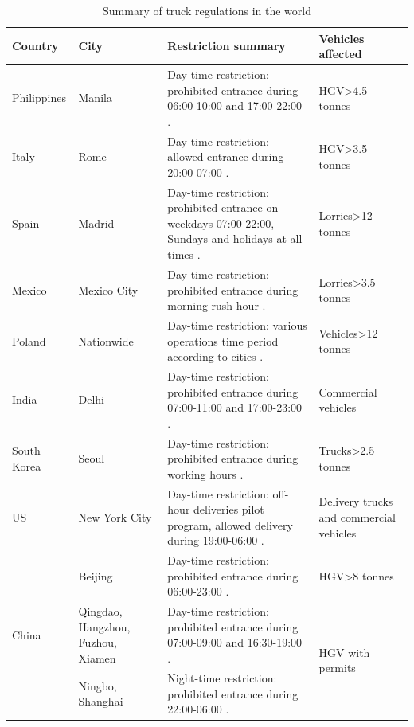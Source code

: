 \documentclass[preprint,12pt,3p]{elsarticle}
\begin{document}
\begin{table}[H]
\footnotesize
\centering
\caption{Summary of truck regulations in the world}
\label{table1}

\begin{tabular}{m{2cm}<{\centering} m{2cm}<{\centering} m{7cm} m{3cm}<{\centering}}
\toprule[1.2pt]
  \textbf{Country} &\textbf{City} &\textbf{Restriction summary} &\textbf{Vehicles affected}\\


  \midrule
   Philippines & Manila & Day-time restriction: prohibited entrance during 06:00-10:00 and 17:00-22:00 \cite{RN183}. & HGV\textgreater4.5 tonnes \\
   
   Italy & Rome & Day-time restriction: allowed entrance during 20:00-07:00 \cite{RN175}. & HGV\textgreater3.5 tonnes \\
   
   Spain & Madrid & Day-time restriction: prohibited entrance on weekdays 07:00-22:00, Sundays and holidays at all times \cite{RN175}. & Lorries\textgreater12 tonnes    \\
   
   Mexico & Mexico City & Day-time restriction: prohibited entrance during morning rush hour \cite{RN177}. & Lorries\textgreater3.5 tonnes \\
   
   Poland & Nationwide & Day-time restriction: various operations time period according to cities \cite{RN175}. & Vehicles\textgreater12 tonnes \\
   
   India & Delhi & Day-time restriction: prohibited entrance during 07:00-11:00 and 17:00-23:00 \cite{RN181}. & Commercial vehicles    \\
  
   South Korea & Seoul & Day-time restriction: prohibited entrance during working hours \cite{RN141}. & Trucks\textgreater2.5 tonnes \\
   
   US & New York City & Day-time restriction: off-hour deliveries pilot program, allowed delivery during 19:00-06:00 \cite{RN178}. & Delivery trucks and commercial vehicles \\
   
   \multirow{6}{2cm}{\quad \: China} & Beijing & Day-time restriction: prohibited entrance during 06:00-23:00 \cite{RN180}. & HGV\textgreater8 tonnes \\
    & Qingdao, Hangzhou, Fuzhou, Xiamen & Day-time restriction: prohibited entrance during 07:00-09:00 and 16:30-19:00 \cite{RN180}. & \multirow{4}{2cm}{HGV with permits} \\
    & Ningbo, Shanghai & Night-time restriction: prohibited entrance during 22:00-06:00 \cite{RN180}. &  \\
    

\end{tabular}
\end{table}
\end{document}
